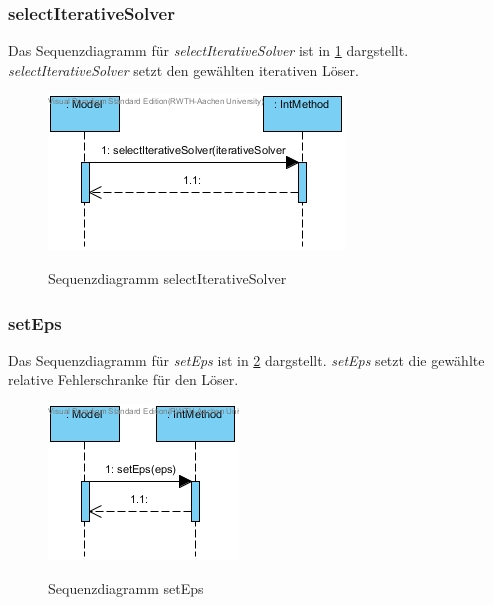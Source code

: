 \subsubsection*{selectIterativeSolver}

Das Sequenzdiagramm für \emph{selectIterativeSolver} ist in \ref{Sequenzdiagramm selectIterativeSolverIntMethod} dargstellt.
\emph{selectIterativeSolver} setzt den gewählten iterativen Löser.

\begin{figure}[H]
	\centering
	\includegraphics{Bilder/IntMethod__selectIterativeSolver().jpg}\\
	\caption{Sequenzdiagramm selectIterativeSolver}
	\label{Sequenzdiagramm selectIterativeSolverIntMethod}
\end{figure}

\subsubsection*{setEps}

Das Sequenzdiagramm für \emph{setEps} ist in \ref{Sequenzdiagramm setEpsIntMethod} dargstellt.
\emph{setEps} setzt die gewählte relative Fehlerschranke für den Löser.

\begin{figure}[H]
	\centering
	\includegraphics{Bilder/IntMethod__setEps().jpg}\\
	\caption{Sequenzdiagramm setEps}
	\label{Sequenzdiagramm setEpsIntMethod}
\end{figure}

